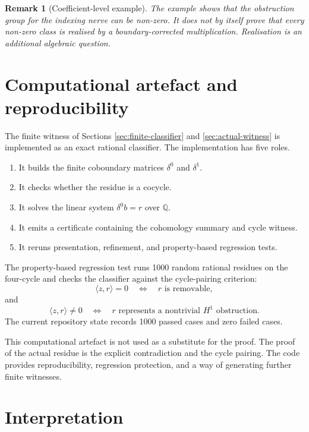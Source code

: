 \documentclass[11pt]{article}
\newtheorem{remark}[theorem]{Remark}
\newcommand{\Q}{\mathbb{Q}}
\begin{document}
\begin{remark}[Coefficient-level example]
The example shows that the obstruction group for the indexing nerve can be non-zero. It does not by itself prove that every non-zero class is realised by a boundary-corrected multiplication. Realisation is an additional algebraic question.
\end{remark}

\section{Computational artefact and reproducibility}

The finite witness of Sections \ref{sec:finite-classifier} and \ref{sec:actual-witness} is implemented as an exact rational classifier. The implementation has five roles.

\begin{enumerate}[label=(\arabic*)]
\item It builds the finite coboundary matrices \(\delta^0\) and \(\delta^1\).
\item It checks whether the residue is a cocycle.
\item It solves the linear system \(\delta^0b=r\) over \(\Q\).
\item It emits a certificate containing the cohomology summary and cycle witness.
\item It reruns presentation, refinement, and property-based regression tests.
\end{enumerate}

The property-based regression test runs 1000 random rational residues on the four-cycle and checks the classifier against the cycle-pairing criterion:
\[
\langle z,r\rangle=0
\quad\Longleftrightarrow\quad
r\text{ is removable},
\]
and
\[
\langle z,r\rangle\neq 0
\quad\Longleftrightarrow\quad
r\text{ represents a nontrivial }H^1\text{ obstruction}.
\]
The current repository state records 1000 passed cases and zero failed cases.

This computational artefact is not used as a substitute for the proof. The proof of the actual residue is the explicit contradiction and the cycle pairing. The code provides reproducibility, regression protection, and a way of generating further finite witnesses.

\section{Interpretation}
\end{document}
